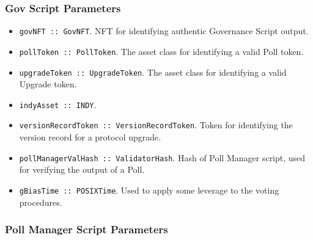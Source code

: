 \documentclass{article}
\begin{document}
\begin{sloppypar}
\hypertarget{gov-script-parameters}{%
\subsubsection{Gov Script Parameters}\label{gov-script-parameters}}

\begin{itemize}
\item
  \texttt{govNFT~::~GovNFT}. NFT for identifying authentic Governance
  Script output.
\item
  \texttt{pollToken~::~PollToken}. The asset class for identifying a
  valid Poll token.
\item
  \texttt{upgradeToken~::~UpgradeToken}. The asset class for identifying
  a valid Upgrade token.
\item
  \texttt{indyAsset~::~INDY}.
\item
  \texttt{versionRecordToken~::~VersionRecordToken}. Token for
  identifying the version record for a protocol upgrade.
\item
  \texttt{pollManagerValHash~::~ValidatorHash}. Hash of Poll Manager
  script, used for verifying the output of a Poll.
\item
  \texttt{gBiasTime~::~POSIXTime}. Used to apply some leverage to the
  voting procedures.
\end{itemize}

\hypertarget{poll-manager-script-parameters}{%
\subsubsection{Poll Manager Script
Parameters}\label{poll-manager-script-parameters}}


\end{sloppypar}
\end{document}
